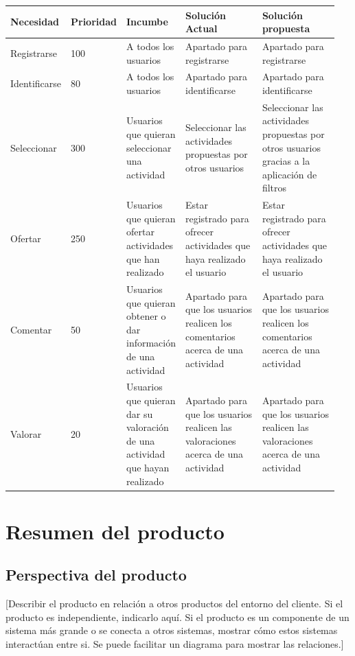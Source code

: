 \documentclass[11pt]{article}
\begin{document}
\begin{table}[H]
  \centering
  \begin{tabular}{p{0.15\linewidth}p{0.15\linewidth}p{0.15\linewidth}p{0.25\linewidth}p{0.25\linewidth}}
    \toprule
    \textbf{Necesidad} & \textbf{Prioridad} & \textbf{Incumbe} & \textbf{Solución Actual} & \textbf{Solución propuesta} \\
    \midrule
    Registrarse & 100 & A todos los usuarios & Apartado para registrarse & Apartado para registrarse\\
    Identificarse & 80 & A todos los usuarios & Apartado para identificarse & Apartado para identificarse\\
    Seleccionar & 300 & Usuarios que quieran seleccionar una actividad & Seleccionar las actividades propuestas por otros usuarios & Seleccionar las actividades propuestas por otros usuarios gracias a la aplicación de filtros\\
    Ofertar & 250 & Usuarios que quieran ofertar actividades que han realizado & Estar registrado para ofrecer actividades que haya realizado el usuario & Estar registrado para ofrecer actividades que haya realizado el usuario\\
    Comentar & 50 & Usuarios que quieran obtener o dar información de una actividad & Apartado para que los usuarios realicen los comentarios acerca de una actividad & Apartado para que los usuarios realicen los comentarios acerca de una actividad\\
    Valorar & 20 & Usuarios que quieran dar su valoración de una actividad que hayan realizado & Apartado para que los usuarios realicen las valoraciones acerca de una actividad & Apartado para que los usuarios realicen las valoraciones acerca de una actividad \\
    
    \bottomrule
  \end{tabular}
\end{table}
\newpage

\section{Resumen del producto}\label{4}
\subsection{Perspectiva del producto}
[Describir el producto en relación a otros productos del entorno del cliente. Si el producto es independiente, indicarlo aquí. Si el producto es un componente de un sistema más grande o se conecta a otros sistemas, mostrar cómo estos sistemas interactúan entre si. Se puede facilitar un diagrama para mostrar las relaciones.]
\end{document}
